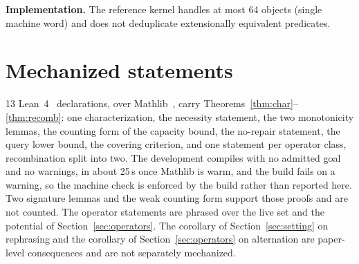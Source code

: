 \documentclass[11pt]{article}
\begin{document}
\textbf{Implementation.} The reference kernel handles at most 64 objects (single machine word) and
does not deduplicate extensionally equivalent predicates.

\appendix

\section{Mechanized statements}

13 Lean~4~\cite{lean4} declarations, over Mathlib~\cite{mathlib}, carry Theorems~\ref{thm:char}--\ref{thm:recomb}: one
characterization, the necessity statement, the two monotonicity lemmas, the counting form of the
capacity bound, the no-repair statement, the query lower bound, the covering criterion, and one
statement per operator class, recombination split into two. The development compiles with no admitted
goal and no warnings, in about 25\,s once Mathlib is warm, and the build fails on a warning, so the
machine check is enforced by the build rather than reported here. Two signature lemmas and the weak
counting form support those proofs and are not counted. The operator statements are phrased over the
live set and the potential of Section~\ref{sec:operators}. The corollary of Section~\ref{sec:setting} on rephrasing
and the corollary of Section~\ref{sec:operators} on alternation are paper-level consequences and are not
separately mechanized.
\end{document}

